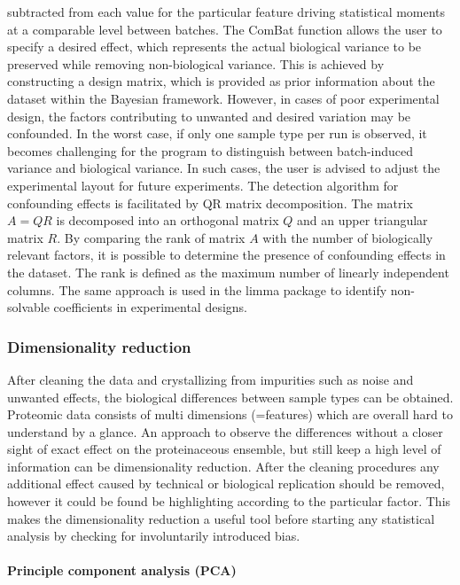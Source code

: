 \documentclass[
  11pt,
]{article}
\begin{document}
subtracted from each value for the particular feature driving
statistical moments at a comparable level between batches. The ComBat
function allows the user to specify a desired effect, which represents
the actual biological variance to be preserved while removing
non-biological variance. This is achieved by constructing a design
matrix, which is provided as prior information about the dataset within
the Bayesian framework. However, in cases of poor experimental design,
the factors contributing to unwanted and desired variation may be
confounded. In the worst case, if only one sample type per run is
observed, it becomes challenging for the program to distinguish between
batch-induced variance and biological variance. In such cases, the user
is advised to adjust the experimental layout for future experiments. The
detection algorithm for confounding effects is facilitated by QR matrix
decomposition. The matrix \(A=QR\) is decomposed into an orthogonal
matrix \(Q\) and an upper triangular matrix \(R\). By comparing the rank
of matrix \(A\) with the number of biologically relevant factors, it is
possible to determine the presence of confounding effects in the
dataset. The rank is defined as the maximum number of linearly
independent columns. The same approach is used in the limma package
\citep{Phipson2016} to identify non-solvable coefficients in
experimental designs.

\hypertarget{dimensionality-reduction}{%
\subsubsection{Dimensionality
reduction}\label{dimensionality-reduction}}

After cleaning the data and crystallizing from impurities such as noise
and unwanted effects, the biological differences between sample types
can be obtained. Proteomic data consists of multi dimensions (=features)
which are overall hard to understand by a glance. An approach to observe
the differences without a closer sight of exact effect on the
proteinaceous ensemble, but still keep a high level of information can
be dimensionality reduction. After the cleaning procedures any
additional effect caused by technical or biological replication should
be removed, however it could be found be highlighting according to the
particular factor. This makes the dimensionality reduction a useful tool
before starting any statistical analysis by checking for involuntarily
introduced bias.

\hypertarget{principle-component-analysis-pca}{%
\paragraph{Principle component analysis
(PCA)}\label{principle-component-analysis-pca}}
\end{document}
